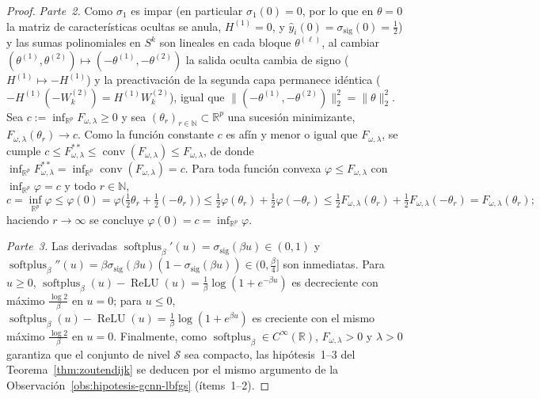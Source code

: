 \documentclass[a4paper,openany,oneside,10pt]{report}
\theoremstyle{pnlTeorema}
\theoremstyle{pnlDefinicion}
\theoremstyle{pnlObservacion}
\begin{document}
\begin{proof}
\emph{Parte~2.} Como $\sigma_1$ es impar (en particular $\sigma_1(0)=0$, por lo que en $\theta=0$ la matriz de características ocultas se anula, $H^{(1)}=0$, y $\hat y_i(0)=\sigma_{\mathrm{sig}}(0)=\frac12$) y las sumas polinomiales en $S^k$ son lineales en cada bloque $\theta^{(\ell)}$, al cambiar $(\theta^{(1)},\theta^{(2)})\mapsto(-\theta^{(1)},-\theta^{(2)})$ la salida oculta cambia de signo ($H^{(1)}\mapsto -H^{(1)}$) y la preactivación de la segunda capa permanece idéntica ($-H^{(1)}(-W_k^{(2)})=H^{(1)}W_k^{(2)}$), igual que $\|(-\theta^{(1)},-\theta^{(2)})\|_2^2=\|\theta\|_2^2$. Sea $c:=\inf_{\mathbb{R}^p} F_{\omega,\lambda}\ge 0$ y sea $(\theta_r)_{r\in\mathbb{N}}\subset\mathbb{R}^p$ una sucesión minimizante, $F_{\omega,\lambda}(\theta_r)\to c$. Como la función constante $c$ es afín y menor o igual que $F_{\omega,\lambda}$, se cumple $c\le F_{\omega,\lambda}^{**}\le\operatorname{conv}(F_{\omega,\lambda})\le F_{\omega,\lambda}$, de donde $\inf_{\mathbb{R}^p} F_{\omega,\lambda}^{**}=\inf_{\mathbb{R}^p}\operatorname{conv}(F_{\omega,\lambda})=c$. Para toda función convexa $\varphi\le F_{\omega,\lambda}$ con $\inf_{\mathbb{R}^p}\varphi=c$ y todo $r\in\mathbb{N}$,
\[
c=\inf_{\mathbb{R}^p}\varphi \le \varphi(0)=\varphi\bigl(\tfrac12\theta_r+\tfrac12(-\theta_r)\bigr)\le \tfrac12\varphi(\theta_r)+\tfrac12\varphi(-\theta_r)\le \tfrac12 F_{\omega,\lambda}(\theta_r)+\tfrac12 F_{\omega,\lambda}(-\theta_r)=F_{\omega,\lambda}(\theta_r);
\]
haciendo $r\to\infty$ se concluye $\varphi(0)=c=\inf_{\mathbb{R}^p}\varphi$.

\emph{Parte~3.} Las derivadas $\operatorname{softplus}_\beta'(u)=\sigma_{\mathrm{sig}}(\beta u)\in(0,1)$ y $\operatorname{softplus}_\beta''(u)=\beta\sigma_{\mathrm{sig}}(\beta u)(1-\sigma_{\mathrm{sig}}(\beta u))\in(0,\frac\beta4]$ son inmediatas. Para $u\ge 0$, $\operatorname{softplus}_\beta(u)-\operatorname{ReLU}(u)=\frac1\beta\log(1+e^{-\beta u})$ es decreciente con máximo $\frac{\log 2}{\beta}$ en $u=0$; para $u\le 0$, $\operatorname{softplus}_\beta(u)-\operatorname{ReLU}(u)=\frac1\beta\log(1+e^{\beta u})$ es creciente con el mismo máximo $\frac{\log 2}{\beta}$ en $u=0$. Finalmente, como $\operatorname{softplus}_\beta\in C^\infty(\mathbb{R})$, $F_{\omega,\lambda}>0$ y $\lambda>0$ garantiza que el conjunto de nivel $\mathcal{S}$ sea compacto, las hipótesis~1--3 del Teorema~\ref{thm:zoutendijk} se deducen por el mismo argumento de la Observación~\ref{obs:hipotesis-gcnn-lbfgs} (ítems~1--2).
\end{proof}
\end{document}

